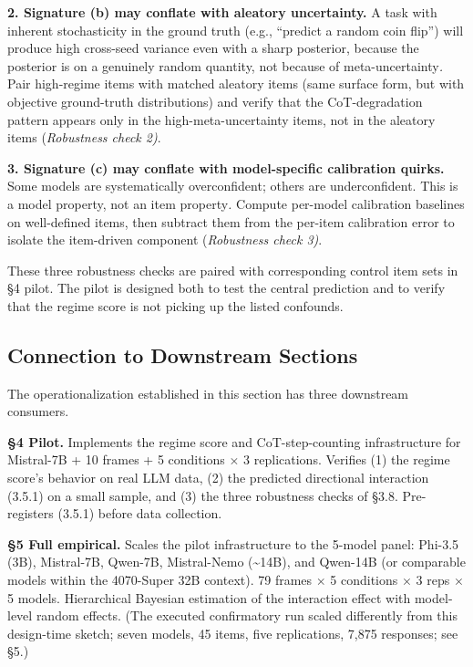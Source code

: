 \documentclass{article}
\begin{document}
\textbf{2. Signature (b) may conflate with aleatory uncertainty.} A task
with inherent stochasticity in the ground truth (e.g., ``predict a
random coin flip'') will produce high cross-seed variance even with a
sharp posterior, because the posterior is on a genuinely random
quantity, not because of meta-uncertainty\emph{.} Pair high-regime items
with matched aleatory items (same surface form, but with objective
ground-truth distributions) and verify that the CoT-degradation pattern
appears only in the high-meta-uncertainty items, not in the aleatory
items (\emph{Robustness check 2)}.

\textbf{3. Signature (c) may conflate with model-specific calibration
quirks.} Some models are systematically overconfident; others are
underconfident. This is a model property, not an item property\emph{.}
Compute per-model calibration baselines on well-defined items, then
subtract them from the per-item calibration error to isolate the
item-driven component (\emph{Robustness check 3)}.

These three robustness checks are paired with corresponding control item
sets in \S{}4 pilot. The pilot is designed both to test the central
prediction and to verify that the regime score is not picking up the
listed confounds.

\subsection{Connection to Downstream
Sections}\label{connection-to-downstream-chapters}

The operationalization established in this section has three downstream
consumers.

\textbf{\S{}4 Pilot.} Implements the regime score and CoT-step-counting
infrastructure for Mistral-7B + 10 frames + 5 conditions \ensuremath{\times} 3
replications. Verifies (1) the regime score's behavior on real LLM data,
(2) the predicted directional interaction (3.5.1) on a small sample, and
(3) the three robustness checks of \S{}3.8. Pre-registers (3.5.1) before
data collection.

\textbf{\S{}5 Full empirical.} Scales the pilot infrastructure to the
5-model panel: Phi-3.5 (3B), Mistral-7B, Qwen-7B, Mistral-Nemo
(\textasciitilde14B), and Qwen-14B (or comparable models within the
4070-Super 32B context). 79 frames \ensuremath{\times} 5 conditions \ensuremath{\times} 3 reps \ensuremath{\times} 5 models.
Hierarchical Bayesian estimation of the interaction effect with
model-level random effects. (The executed confirmatory run scaled
differently from this design-time sketch; seven models, 45 items, five
replications, 7,875 responses; see \S{}5.)
\end{document}
